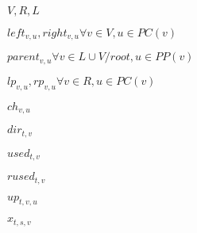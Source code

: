 \documentclass[11pt,a4paper,oneside]{article}
\begin{document}
    $V, R, L$
    
    $left_{v,u}, right_{v,u} \forall v \in V, u \in PC(v)$

    $parent_{v,u} \forall v \in L \cup V / root, u \in PP(v)$

    $lp_{v,u}, rp_{v,u} \forall v \in R, u \in PC(v)$
   
    $ch_{v,u}$

    $dir_{t,v}$

    $used_{t,v}$

    $rused_{t,v}$

    $up_{t,v,u}$

    $x_{t,s,v}$

    
\end{document}
